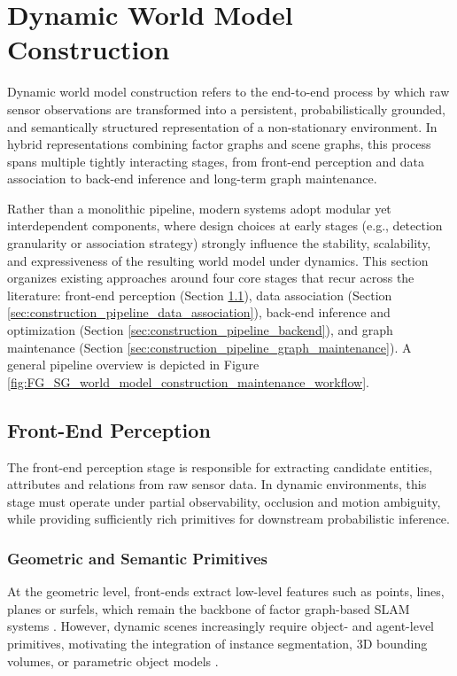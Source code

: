 \section{Dynamic World Model Construction}\label{sec:construction_pipeline}
Dynamic world model construction refers to the end-to-end process by which raw sensor observations are transformed into a persistent, probabilistically grounded, and semantically structured representation of a non-stationary environment. 
In hybrid representations combining factor graphs and scene graphs, this process spans multiple tightly interacting stages, from front-end perception and data association to back-end inference and long-term graph maintenance.

Rather than a monolithic pipeline, modern systems adopt modular yet interdependent components, where design choices at early stages (e.g., detection granularity or association strategy) strongly influence the stability, scalability, and expressiveness of the resulting world model under dynamics.
This section organizes existing approaches around four core stages that recur across the literature: front-end perception (Section \ref{sec:construction_pipeline_frontend}), data association (Section \ref{sec:construction_pipeline_data_association}), back-end inference and optimization (Section \ref{sec:construction_pipeline_backend}), and graph maintenance (Section \ref{sec:construction_pipeline_graph_maintenance}).
A general pipeline overview is depicted in Figure \ref{fig:FG_SG_world_model_construction_maintenance_workflow}.

\subsection{Front-End Perception}\label{sec:construction_pipeline_frontend}
The front-end perception stage is responsible for extracting candidate entities, attributes and relations from raw sensor data.
In dynamic environments, this stage must operate under partial observability, occlusion and motion ambiguity, while providing sufficiently rich primitives for downstream probabilistic inference. 

\subsubsection{Geometric and Semantic Primitives}
At the geometric level, front-ends extract low-level features such as points, lines, planes or surfels, which remain the backbone of factor graph-based SLAM systems \cite{dellaert_factor_2017} \cite{rosinol_kimera_2021}. 
However, dynamic scenes increasingly require object- and agent-level primitives, motivating the integration of instance segmentation, 3D bounding volumes, or parametric object models \cite{bescos_dynaslam_2021} \cite{morris_dynosam_2025} \cite{schmid_khronos_2024}.

